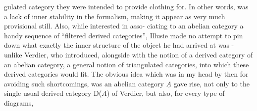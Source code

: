 gulated category they were intended to provide clothing for. In other
words,  was a lack of inner stability in the formalism, making it
appear as very much provisional still. Also, while interested in asso-%
ciating to an abelian category a handy sequence of ``filtered derived
categories'', Illusie made no attempt to pin down what exactly the
inner structure of the object he had arrived at was - unlike Verdier,
who  introduced, alongside with the notion of a derived category of an
abelian category, a general notion of triangulated categories, into
which these derived categories would fit. The obvious idea which was in
my head by then for avoiding such shortcomings, was  an
abelian category $\underline{A}$ gave rise, not only to the  single usual
derived category D($\underline{A}$) of Verdier, but also, for every type of diagrams,

